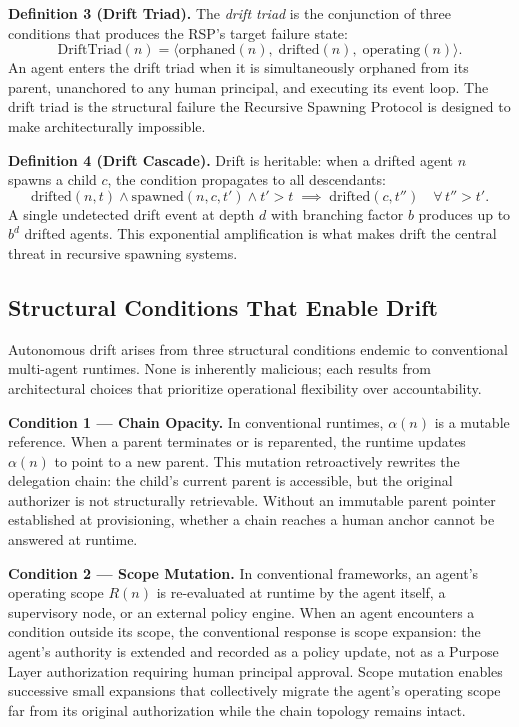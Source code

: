 \medskip
\noindent\textbf{Definition 3 (Drift Triad).}
The \emph{drift triad} is the conjunction of three conditions that produces the RSP's target failure state:
\begin{equation}
\mathrm{DriftTriad}(n) = \langle \mathrm{orphaned}(n),\; \mathrm{drifted}(n),\; \mathrm{operating}(n) \rangle.
\label{eq:drift-triad}
\end{equation}
An agent enters the drift triad when it is simultaneously orphaned from its parent, unanchored to any human principal, and executing its event loop. The drift triad is the structural failure the Recursive Spawning Protocol is designed to make architecturally impossible.

\medskip
\noindent\textbf{Definition 4 (Drift Cascade).}
Drift is heritable: when a drifted agent $n$ spawns a child $c$, the condition propagates to all descendants:
\begin{equation}
\mathrm{drifted}(n, t) \land \mathrm{spawned}(n, c, t') \land t' > t \;\implies\; \mathrm{drifted}(c, t'')\quad \forall\, t'' > t'.
\label{eq:drift-cascade}
\end{equation}
A single undetected drift event at depth $d$ with branching factor $b$ produces up to $b^d$ drifted agents. This exponential amplification is what makes drift the central threat in recursive spawning systems.

\subsection{Structural Conditions That Enable Drift}
\label{sec:drift-conditions}

Autonomous drift arises from three structural conditions endemic to conventional multi-agent runtimes. None is inherently malicious; each results from architectural choices that prioritize operational flexibility over accountability.

\medskip
\noindent\textbf{Condition 1 — Chain Opacity.}
In conventional runtimes, $\alpha(n)$ is a mutable reference. When a parent terminates or is reparented, the runtime updates $\alpha(n)$ to point to a new parent. This mutation retroactively rewrites the delegation chain: the child's current parent is accessible, but the original authorizer is not structurally retrievable. Without an immutable parent pointer established at provisioning, whether a chain reaches a human anchor cannot be answered at runtime.

\medskip
\noindent\textbf{Condition 2 — Scope Mutation.}
In conventional frameworks, an agent's operating scope $R(n)$ is re-evaluated at runtime by the agent itself, a supervisory node, or an external policy engine. When an agent encounters a condition outside its scope, the conventional response is scope expansion: the agent's authority is extended and recorded as a policy update, not as a Purpose Layer authorization requiring human principal approval. Scope mutation enables successive small expansions that collectively migrate the agent's operating scope far from its original authorization while the chain topology remains intact.

